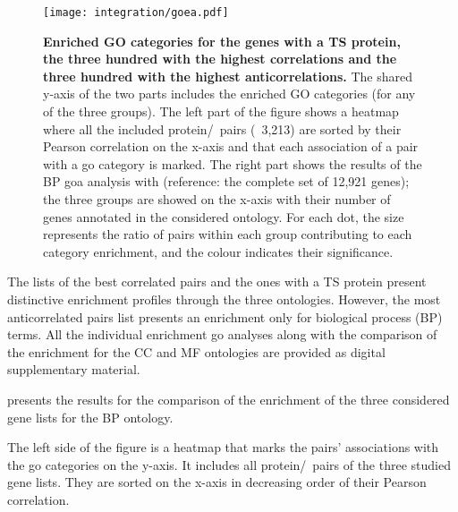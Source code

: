     \begin{sidewaysfigure}
        \texttt{[image: integration/goea.pdf]}\centering
        \vspace{-3mm}
        \caption[Enriched GO categories for the genes with a TS protein and
        the three hundred with the highest correlations
        and anticorrelationss]{\label{fig:goares}%
        \textbf{Enriched GO categories for the genes with a TS protein,
        the three hundred with the highest correlations and
        the three hundred with the highest anticorrelations.}
        The shared y-axis of the two parts includes the enriched GO categories
        (for any of the three groups).
        The left part of the figure shows
        a heatmap where all the included protein/\mRNA\ pairs (\ie\ 3,213)
        are sorted by their Pearson correlation on the x-axis and
        that each association of a pair with a \gls{go} category is marked.
        The right part shows the results of the BP \gls{goa} analysis
        with  (reference: the complete set of 12,921 genes);
        the three groups are showed on the x-axis with their number of genes
        annotated in the considered ontology.
        For each dot, the size represents the ratio of pairs within each group
        contributing to each category enrichment,
        and the colour indicates their significance.
        }
    \end{sidewaysfigure}


The lists of the best correlated pairs and
the ones with a \gls{TS} protein present distinctive enrichment profiles
through the three ontologies.
However, the most anticorrelated pairs list presents
an enrichment only for biological process (BP) terms.
All the individual enrichment \gls{go} analyses
along with the comparison of the enrichment for the CC and MF ontologies
are provided as digital supplementary material.\mybr\

 presents the results for
the comparison of the enrichment of the three considered gene lists
for the BP ontology.\mybr\

The left side of the figure is a heatmap
that marks the pairs' associations with the \gls{go} categories on the y-axis.
It includes all protein/\mRNA\ pairs of the three studied gene lists.
They are sorted on the x-axis in decreasing order of their Pearson correlation.\mybr\

